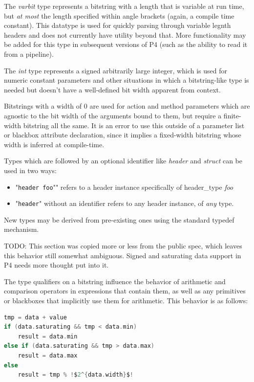 \documentclass[12pt]{article}
\begin{document}
The \textit{varbit} type represents a bitstring with a length that is variable
at run time, but \textit{at most} the length specified within angle brackets
(again, a compile time constant). This datatype is used for quickly parsing
through variable legnth headers and does not currently have utility beyond
that. More functionality may be added for this type in subsequent versions of P4
(such as the ability to read it from a \matchaction pipeline).

The \textit{int} type represents a signed arbitrarily large integer, which is
used for numeric constant parameters and other situations in which a
bitstring-like type is needed but doesn't have a well-defined bit width
apparent from context.

Bitstrings with a width of 0 are used for action and method parameters which are
agnostic to the bit width of the arguments bound to them, but require a finite-
width bitstring all the same. It is an error to use this outside of a parameter
list or blackbox attribute declaration, since it implies a fixed-width bitstring
whose width is inferred at compile-time.

Types which are followed by an optional identifier like \textit{header} and
\textit{struct} can be used in two ways:
\begin{itemize}
\item
    "\texttt{header foo}"" refers to a header instance specifically of
    header_type \textit{foo}
\item
    "\texttt{header}" without an identifier refers to any header instance,
    of \textit{any} type.
\end{itemize}

New types may be derived from pre-existing ones using the standard typedef
mechanism.


TODO: This section was copied more or less from the public spec, which leaves
this behavior still somewhat ambiguous. Signed and saturating data support in P4
needs more thought put into it.


The type qualifiers on a bitstring influence the behavior of arithmetic and
comparison operators in expressions that contain them, as well as any primitives
or blackboxes that implicitly use them for arithmetic. This behavior is as
follows:

\begin{lstlisting}[language=C,frame=single,backgroundcolor=\color{nonp4orange},escapechar=!]
tmp = data + value
if (data.saturating && tmp < data.min)
    result = data.min
else if (data.saturating && tmp > data.max)
    result = data.max
else
    result = tmp % !$2^{data.width}$!
\end{lstlisting}
\end{document}
